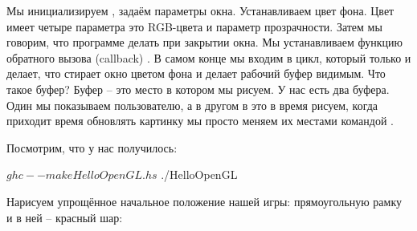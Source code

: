 Мы инициализируем , задаём параметры
окна. Устанавливаем
цвет фона. Цвет имеет четыре параметра это RGB-цвета и
параметр прозрачности. Затем мы говорим, что программе делать
при закрытии окна. Мы устанавливаем функцию обратного вызова
(callback) . В самом конце мы входим
в цикл, который только и делает, что стирает окно цветом фона
и делает рабочий буфер видимым. 
Что такое буфер? Буфер -- это место в котором мы рисуем. 
У нас есть два буфера.
Один мы показываем пользователю, а в другом в это в время рисуем,
когда приходит время обновлять картинку мы просто меняем 
их местами командой .

Посмотрим, что у нас получилось:

\begin{code}
$ ghc --make HelloOpenGL.hs
$ ./HelloOpenGL
\end{code}

Нарисуем упрощённое начальное положение нашей игры:
прямоугольную рамку и в ней -- красный шар:

